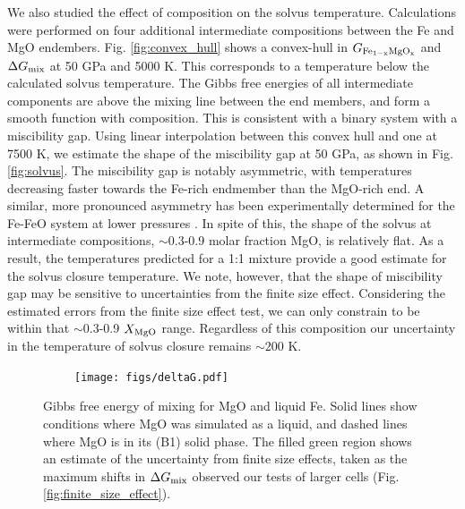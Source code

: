 We also studied the effect of composition on the solvus temperature.  Calculations were
performed on four additional intermediate compositions between the Fe and MgO endembers.
Fig. \ref{fig:convex_hull} shows a convex-hull in $G_{\rm Fe_{1-x}MgO_{x}}$ and $\Delta
G_{\rm mix}$ at 50 GPa and 5000 K. This corresponds to a temperature below the calculated
solvus temperature. The Gibbs free energies of all intermediate components are above the
mixing line between the end members, and form a smooth function with composition. This is
consistent with a binary system with a miscibility gap. Using linear interpolation
between this convex hull and one at 7500 K, we estimate the shape of the miscibility gap
at 50 GPa, as shown in Fig. \ref{fig:solvus}. The miscibility gap is notably asymmetric,
with temperatures decreasing faster towards the Fe-rich endmember than the MgO-rich end.
A similar, more pronounced asymmetry has been experimentally determined for the Fe-FeO
system at lower pressures \citep{Ohtani1984a,Kato1989}. In spite of this, the shape of the
solvus at intermediate compositions, $\sim$0.3-0.9 molar fraction MgO, is relatively
flat. As a result, the temperatures predicted for a 1:1 mixture provide a good estimate
for the solvus closure temperature. We note, however, that the shape of miscibility gap
may be sensitive to uncertainties from the finite size effect. Considering the estimated
errors from the finite size effect test, we can only constrain to be within that
$\sim$0.3-0.9 $X_{\rm MgO}$ range. Regardless of this composition our uncertainty in the
temperature of solvus closure remains $\sim200$ K.


\begin{figure}[h!]  
  \centering
    \texttt{[image: figs/deltaG.pdf]}
\caption{Gibbs free energy of mixing for MgO and liquid Fe. Solid lines show conditions
  where MgO was simulated as a liquid, and dashed lines where MgO is in its (B1) solid
  phase.  The filled green region shows an estimate of the uncertainty from finite size
  effects, taken as the maximum shifts in $\Delta G_{\rm{mix}}$ observed our tests of larger
  cells (Fig. \ref{fig:finite_size_effect}).
}
\label{fig:deltaG}
\end{figure}

